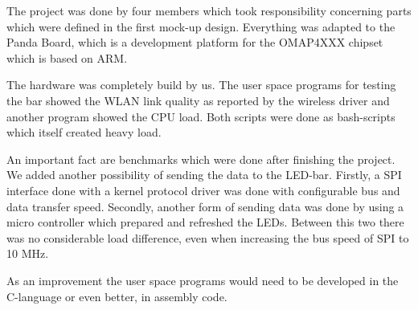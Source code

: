 The project was done by four members which took responsibility concerning parts which were defined in the first mock-up design.
Everything was adapted to the Panda Board, which is a development platform for the OMAP4XXX chipset which is based on 
ARM.

The hardware was completely build by us. The user space programs for testing the bar showed the WLAN link quality as reported
by the wireless driver and another program showed the CPU load. Both scripts were done as bash-scripts which itself created 
heavy load.

An important fact are benchmarks which were done after finishing the project. We added another possibility of sending the data 
to the LED-bar. Firstly, a SPI interface done with a kernel protocol driver was done with configurable bus and data transfer speed.
Secondly, another form of sending data was done by using a micro controller which prepared and refreshed the LEDs.
Between this two there was no considerable load difference, even when increasing the bus speed of SPI to 10 MHz.

As an improvement the user space programs would need to be developed in the C-language or even better, in assembly code.
